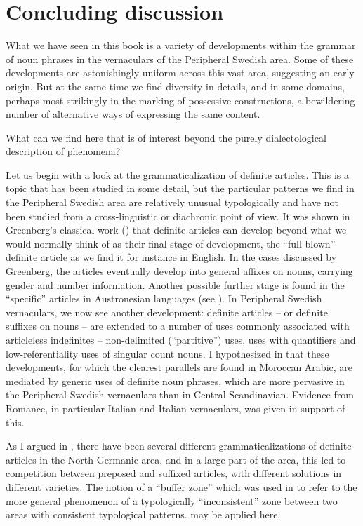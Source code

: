 
\chapter{Concluding discussion}

What we have seen in this book is a variety of developments within the grammar of noun phrases in the vernaculars of the Peripheral Swedish area. Some of these developments are astonishingly uniform across this vast area, suggesting an early origin. But at the same time we find diversity in details, and in some domains, perhaps most strikingly in the marking of possessive constructions, a bewildering number of alternative ways of expressing the same content. 

What can we find here that is of interest beyond the purely dialectological description of phenomena? 

Let us begin with a look at the grammaticalization of definite articles. This is a topic that has been studied in some detail, but the particular patterns we find in the Peripheral Swedish area are relatively unusual typologically and have not been studied from a cross-linguistic or diachronic point of view. It was shown in Greenberg’s classical work (\citet{Greenberg1978}) that definite articles can develop beyond what we would normally think of as their final stage of development, the “full-blown” definite article as we find it for instance in English. In the cases discussed by Greenberg, the articles eventually develop into general affixes on nouns, carrying gender and number information. Another possible further stage is found in the “specific” articles in Austronesian languages (see ). In Peripheral Swedish vernaculars, we now see another development: definite articles – or definite suffixes on nouns – are extended to a number of uses commonly associated with articleless indefinites – non-delimited (“partitive”) uses, uses with quantifiers and low-referentiality uses of singular count nouns. I hypothesized in  that these developments, for which the clearest parallels are found in Moroccan Arabic, are mediated by generic uses of definite noun phrases, which are more pervasive in the Peripheral Swedish vernaculars than in Central Scandinavian. Evidence from Romance, in particular Italian and Italian vernaculars, was given in support of this. 

As I argued in \citet{Dahl2003}, there have been several different grammaticalizations of definite articles in the North Germanic area, and in a large part of the area, this led to competition between preposed and suffixed articles, with different solutions in different varieties. The notion of a “buffer zone” which was used in \citet{Stilo2004} to refer to the more general phenomenon of a typologically “inconsistent” zone between two areas with consistent typological patterns.  may be applied here.

